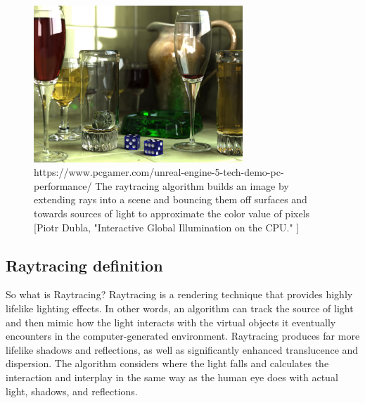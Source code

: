 \documentclass[11pt,a4paper]{article}
\begin{document}
	
		\begin{figure}[H]
		\begin{center}
		\includegraphics[width=0.7\textwidth]{1.jpg}
			
			\caption{https://www.pcgamer.com/unreal-engine-5-tech-demo-pc-performance/ The raytracing algorithm builds an image by extending rays into a scene and bouncing them off surfaces and towards sources of light to approximate the color value of pixels [Piotr Dubla, "Interactive Global Illumination on the CPU."
				]}
			\label{fig:1}
		\end{center}
	\end{figure}

		
	\subsection{Raytracing definition}
	So what is Raytracing? Raytracing is a rendering technique that provides highly lifelike lighting effects. In other words, an algorithm can track the source of light and then mimic how the light interacts with the virtual objects it eventually encounters in the computer-generated environment. Raytracing produces far more lifelike shadows and reflections, as well as significantly enhanced translucence and dispersion. The algorithm considers where the light falls and calculates the interaction and interplay in the same way as the human eye does with actual light, shadows, and reflections.
	
	\vspace*{5px}
	
\end{document}
